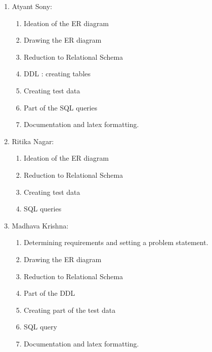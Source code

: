 \documentclass[12pt]{report}
\begin{document}
\begin{enumerate}
		\item Atyant Sony:
			\begin{enumerate}
				\item Ideation of the ER diagram
				\item Drawing the ER diagram
				\item Reduction to Relational Schema
				\item DDL : creating tables
				\item Creating test data
				\item Part of the SQL queries
				\item Documentation and latex formatting.
			\end{enumerate}
		\item Ritika Nagar:			
			\begin{enumerate}
				\item Ideation of the ER diagram
				\item Reduction to Relational Schema
				\item Creating test data
				\item SQL queries
			\end{enumerate}
		\item Madhava Krishna:
			\begin{enumerate}
				\item Determining requirements and setting a problem statement.
				\item Drawing the ER diagram
				\item Reduction to Relational Schema
				\item Part of the DDL
				\item Creating part of the test data
				\item SQL query
				\item Documentation and latex formatting.
			\end{enumerate}
	\end{enumerate}
\end{document}
